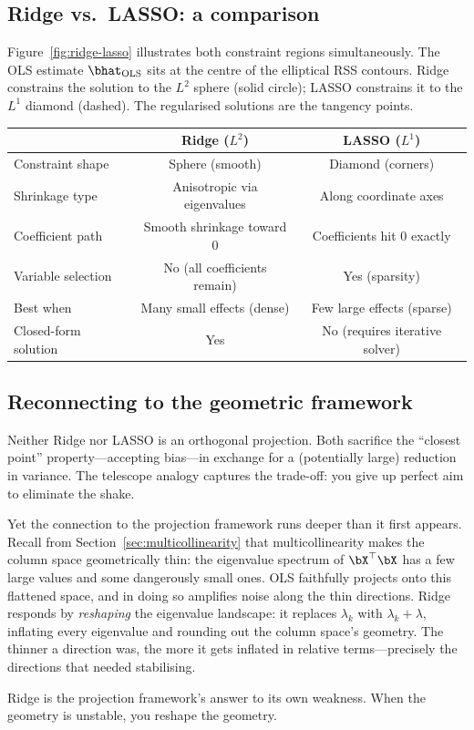 \subsection{Ridge vs.\ LASSO: a comparison}

Figure~\ref{fig:ridge-lasso} illustrates both constraint regions
simultaneously.
The OLS estimate $\bhat_{\text{OLS}}$ sits at the centre of the
elliptical RSS contours.
Ridge constrains the solution to the $L^2$ sphere (solid circle);
LASSO constrains it to the $L^1$ diamond (dashed).
The regularised solutions are the tangency points.

\begin{center}
\begin{tabular}{lcc}
\toprule
& \textbf{Ridge ($L^2$)} & \textbf{LASSO ($L^1$)} \\
\midrule
Constraint shape & Sphere (smooth) & Diamond (corners) \\
Shrinkage type & Anisotropic via eigenvalues & Along coordinate axes \\
Coefficient path & Smooth shrinkage toward 0 & Coefficients hit 0 exactly \\
Variable selection & No (all coefficients remain) & Yes (sparsity) \\
Best when & Many small effects (dense) & Few large effects (sparse) \\
Closed-form solution & Yes & No (requires iterative solver) \\
\bottomrule
\end{tabular}
\end{center}


\subsection{Reconnecting to the geometric framework}

Neither Ridge nor LASSO is an orthogonal projection.
Both sacrifice the ``closest point'' property---accepting bias---in
exchange for a (potentially large) reduction in variance.
The telescope analogy captures the trade-off:
you give up perfect aim to eliminate the shake.

Yet the connection to the projection framework runs deeper than it
first appears.
Recall from Section~\ref{sec:multicollinearity} that
multicollinearity makes the column space geometrically thin:
the eigenvalue spectrum of $\bX^\top\bX$ has a few large values
and some dangerously small ones.
OLS faithfully projects onto this flattened space, and in doing so
amplifies noise along the thin directions.
Ridge responds by \emph{reshaping} the eigenvalue landscape:
it replaces $\lambda_k$ with $\lambda_k + \lambda$, inflating every
eigenvalue and rounding out the column space's geometry.
The thinner a direction was, the more it gets inflated in relative
terms---precisely the directions that needed stabilising.

Ridge is the projection framework's answer to its own weakness.
When the geometry is unstable, you reshape the geometry.

